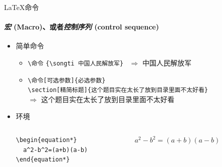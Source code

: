 \begin{frame}[fragile]{\LaTeX{}命令}
  \framesubtitle{\emph{宏} (Macro)、或者\emph{控制序列} (control sequence)}
\begin{itemize}
\item 简单命令
  \begin{itemize}
    \item \verb|\命令|\hspace{2em}
    \verb|{\songti 中国人民解放军}| ~$\Rightarrow$ {\songti 中国人民解放军}
  \item \verb|\命令[可选参数]{必选参数}|\\
\verb|\section[精简标题]{这个题目实在太长了放到目录里面不太好看}|\\
$\Rightarrow$ { \hspace{1em} \songti 这个题目实在太长了放到目录里面不太好看}
  \end{itemize}
\item 环境
  \begin{columns}[c]
  \begin{column}{0.45\textwidth}
    \begin{lstlisting}[basicstyle=\ttfamily]
\begin{equation*}
  a^2-b^2=(a+b)(a-b)
\end{equation*}
\end{lstlisting}
\end{column}\hspace{1em}
  \begin{column}{0.45\textwidth}
$ a^2-b^2=(a+b)(a-b)$
\end{column}
  \end{columns}
\end{itemize}
\end{frame}

